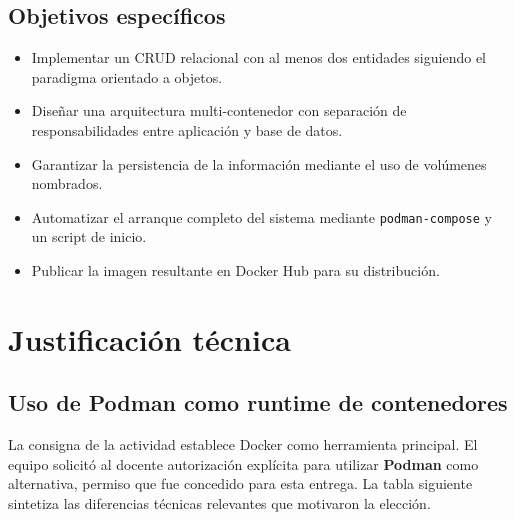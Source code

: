 \documentclass[12pt,a4paper]{article}
\begin{document}
\subsection{Objetivos específicos}

\begin{itemize}
    \item Implementar un CRUD relacional con al menos dos entidades siguiendo el paradigma orientado a objetos.
    \item Diseñar una arquitectura multi-contenedor con separación de responsabilidades entre aplicación y base de datos.
    \item Garantizar la persistencia de la información mediante el uso de volúmenes nombrados.
    \item Automatizar el arranque completo del sistema mediante \texttt{podman-compose} y un script de inicio.
    \item Publicar la imagen resultante en Docker Hub para su distribución.
\end{itemize}

\section{Justificación técnica}

\subsection{Uso de Podman como runtime de contenedores}

La consigna de la actividad establece Docker como herramienta principal. El equipo solicitó al docente autorización explícita para utilizar \textbf{Podman} como alternativa, permiso que fue concedido para esta entrega. La tabla siguiente sintetiza las diferencias técnicas relevantes que motivaron la elección.
\end{document}
